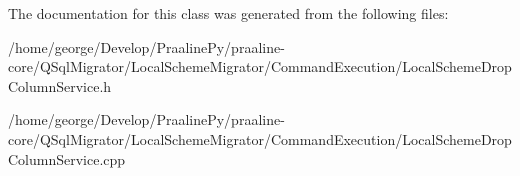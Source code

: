 The documentation for this class was generated from the following files\+:\begin{DoxyCompactItemize}
\item 
/home/george/\+Develop/\+Praaline\+Py/praaline-\/core/\+Q\+Sql\+Migrator/\+Local\+Scheme\+Migrator/\+Command\+Execution/Local\+Scheme\+Drop\+Column\+Service.\+h\item 
/home/george/\+Develop/\+Praaline\+Py/praaline-\/core/\+Q\+Sql\+Migrator/\+Local\+Scheme\+Migrator/\+Command\+Execution/Local\+Scheme\+Drop\+Column\+Service.\+cpp\end{DoxyCompactItemize}

